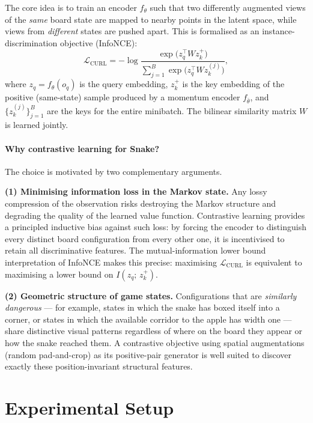 \documentclass[11pt]{article}
\begin{document}
The core idea is to train an encoder $f_\theta$ such that two differently
augmented views of the \emph{same} board state are mapped to nearby points
in the latent space, while views from \emph{different} states are pushed apart.
This is formalised as an instance-discrimination objective (InfoNCE):
\begin{equation}
    \mathcal{L}_{\text{CURL}}
    = -\log \frac{\exp\!\bigl(z_q^\top W z_k^+\bigr)}
                 {\sum_{j=1}^{B} \exp\!\bigl(z_q^\top W z_k^{(j)}\bigr)},
    \label{eq:infonce}
\end{equation}
where $z_q = f_\theta(o_q)$ is the query embedding, $z_k^+$ is the key
embedding of the positive (same-state) sample produced by a momentum encoder
$f_{\bar\theta}$, and $\{z_k^{(j)}\}_{j=1}^B$ are the keys for the entire
minibatch.
The bilinear similarity matrix $W$ is learned jointly.

\paragraph{Why contrastive learning for Snake?}
The choice is motivated by two complementary arguments.

\textbf{(1) Minimising information loss in the Markov state.}
Any lossy compression of the observation risks destroying the Markov structure
and degrading the quality of the learned value function.
Contrastive learning provides a principled inductive bias against such loss:
by forcing the encoder to distinguish every distinct board configuration
from every other one, it is incentivised to retain all discriminative features.
The mutual-information lower bound interpretation of InfoNCE \cite{oord2018cpc}
makes this precise: maximising $\mathcal{L}_{\text{CURL}}$ is equivalent to
maximising a lower bound on $I(z_q;\, z_k^+)$.

\textbf{(2) Geometric structure of game states.}
Configurations that are \emph{similarly dangerous} — for example, states in
which the snake has boxed itself into a corner, or states in which the
available corridor to the apple has width one — share distinctive visual
patterns regardless of where on the board they appear or how the snake reached
them.
A contrastive objective using spatial augmentations (random pad-and-crop)
as its positive-pair generator is well suited to discover exactly these
position-invariant structural features.

\section{Experimental Setup}
\end{document}

